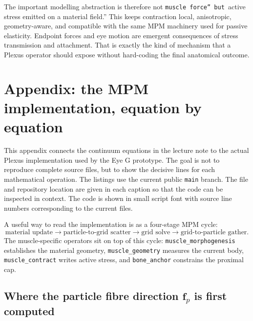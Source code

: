 \documentclass[11pt]{article}
\newcommand{\vect}[1]{\bm{#1}}
\begin{document}
\begin{tcolorbox}[colback=soft,colframe=accent,title=Interpretation for Plexus]
The important modelling abstraction is therefore not \texttt{muscle force'' but }active stress emitted on a material field.'' This keeps contraction local, anisotropic, geometry-aware, and compatible with the same MPM machinery used for passive elasticity. Endpoint forces and eye motion are emergent consequences of stress transmission and attachment. That is exactly the kind of mechanism that a Plexus operator should expose without hard-coding the final anatomical outcome.
\end{tcolorbox}



\appendix
\section{Appendix: the MPM implementation, equation by equation}

This appendix connects the continuum equations in the lecture note to the actual Plexus implementation used by the Eye G prototype. The goal is not to reproduce complete source files, but to show the decisive lines for each mathematical operation. The listings use the current public \texttt{main} branch. The file and repository location are given in each caption so that the code can be inspected in context. The code is shown in small script font with source line numbers corresponding to the current files.

A useful way to read the implementation is as a four-stage MPM cycle:
\begin{equation}
\text{material update}
\rightarrow
\text{particle-to-grid scatter}
\rightarrow
\text{grid solve}
\rightarrow
\text{grid-to-particle gather}.
\label{eq:auto22}
\end{equation}
The muscle-specific operators sit on top of this cycle: \texttt{muscle\_morphogenesis} establishes the material geometry, \texttt{muscle\_geometry} measures the current body, \texttt{muscle\_contract} writes active stress, and \texttt{bone\_anchor} constrains the proximal cap.

\subsection{Where the particle fibre direction \texorpdfstring{$\vect f_p$}{f_p} is first computed}
\end{document}
